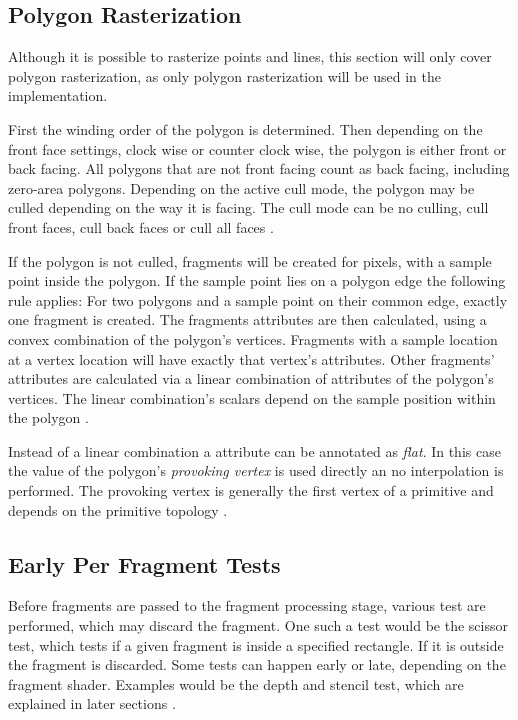 \subsection{Polygon Rasterization}
Although it is possible to rasterize points and lines, this section will only cover polygon rasterization, as only polygon rasterization will be used in the implementation.

First the winding order of the polygon is determined. Then depending on the front face settings, clock wise or counter clock wise, the polygon is either front or back facing. All polygons that are not front facing count as back facing, including zero-area polygons. Depending on the active cull mode, the polygon may be culled depending on the way it is facing. The cull mode can be no culling, cull front faces, cull back faces or cull all faces \cite{akine:2018:realtime, khronos:vulkan:spec1.1}.

If the polygon is not culled, fragments will be created for pixels, with a sample point inside the polygon. If the sample point lies on a polygon edge the following rule applies: For two polygons and a sample point on their common edge, exactly one fragment is created. The fragments attributes are then calculated, using a convex combination of the polygon's vertices. Fragments with a sample location at a vertex location will have exactly that vertex's attributes. Other fragments' attributes are calculated via a linear combination of attributes of the polygon's vertices. The linear combination's scalars depend on the sample position within the polygon \cite{akine:2018:realtime, khronos:vulkan:spec1.1}.

Instead of a linear combination a attribute can be annotated  as \textit{flat}. In this case the value of the polygon's \textit{provoking vertex} is used directly an no interpolation is performed. The provoking vertex is generally the first vertex of a primitive and depends on the primitive topology \cite{akine:2018:realtime, khronos:vulkan:spec1.1}.

\subsection{Early Per Fragment Tests}
Before fragments are passed to the fragment processing stage, various test are performed, which may discard the fragment. One such a test would be the scissor test, which tests if a given fragment is inside a specified rectangle. If it is outside the fragment is discarded. Some tests can happen early or late, depending on the fragment shader. Examples would be the depth and stencil test, which are explained in later sections \cite{khronos:vulkan:spec1.1}.

